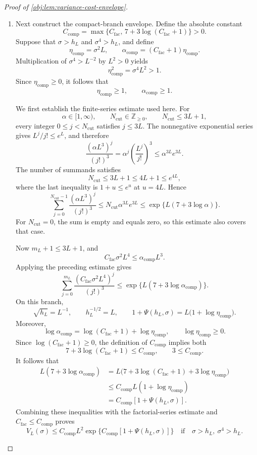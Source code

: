 \begin{proof}[Proof of \cref{obj:lem:variance-cost-envelope}]
\begin{enumerate}
\item Next construct the compact-branch envelope. Define the absolute constant
\[
C_{\mathrm{comp}}
=\max\{C_{\mathrm{fac}},\,7+3\log(C_{\mathrm{fac}}+1)\}>0.
\]
Suppose that \(\sigma>h_L\) and \(\sigma^4>h_L\), and define
\[
\eta_{\mathrm{comp}}=\sigma^2L,
\qquad
\alpha_{\mathrm{comp}}=(C_{\mathrm{fac}}+1)\eta_{\mathrm{comp}}.
\]
Multiplication of \(\sigma^4>L^{-2}\) by \(L^2>0\) yields
\[
\eta_{\mathrm{comp}}^2=\sigma^4L^2>1.
\]
Since \(\eta_{\mathrm{comp}}\ge0\), it follows that
\[
\eta_{\mathrm{comp}}\ge1,
\qquad
\alpha_{\mathrm{comp}}\ge1.
\]

We first establish the finite-series estimate used here. For
\[
\alpha\in[1,\infty),
\qquad
N_{\mathrm{cut}}\in\mathbb Z_{\ge0},
\qquad
N_{\mathrm{cut}}\le3L+1,
\]
every integer \(0\le j<N_{\mathrm{cut}}\) satisfies \(j\le3L\).
The nonnegative exponential series gives \(L^j/j!\le e^L\), and therefore
\[
\frac{(\alpha L^3)^j}{(j!)^3}
=\alpha^j\left(\frac{L^j}{j!}\right)^3
\le \alpha^{3L}e^{3L}.
\]
The number of summands satisfies
\[
N_{\mathrm{cut}}\le3L+1\le4L+1\le e^{4L},
\]
where the last inequality is \(1+u\le e^u\) at \(u=4L\). Hence
\[
\sum_{j=0}^{N_{\mathrm{cut}}-1}
\frac{(\alpha L^3)^j}{(j!)^3}
\le N_{\mathrm{cut}}\alpha^{3L}e^{3L}
\le \exp\{L(7+3\log\alpha)\}.
\]
For \(N_{\mathrm{cut}}=0\), the sum is empty and equals zero, so this estimate
also covers that case.

Now \(m_L+1\le3L+1\), and
\[
C_{\mathrm{fac}}\sigma^2L^4
\le \alpha_{\mathrm{comp}}L^3.
\]
Applying the preceding estimate gives
\[
\sum_{j=0}^{m_L}
\frac{(C_{\mathrm{fac}}\sigma^2L^4)^j}{(j!)^3}
\le
\exp\{L(7+3\log\alpha_{\mathrm{comp}})\}.
\]
On this branch,
\[
\sqrt{h_L}=L^{-1},
\qquad
h_L^{-1/2}=L,
\qquad
1+\Psi(h_L,\sigma)
=L\bigl(1+\log\eta_{\mathrm{comp}}\bigr).
\]
Moreover,
\[
\log\alpha_{\mathrm{comp}}
=\log(C_{\mathrm{fac}}+1)+\log\eta_{\mathrm{comp}},
\qquad
\log\eta_{\mathrm{comp}}\ge0.
\]
Since \(\log(C_{\mathrm{fac}}+1)\ge0\), the definition of
\(C_{\mathrm{comp}}\) implies both
\[
7+3\log(C_{\mathrm{fac}}+1)\le C_{\mathrm{comp}},
\qquad
3\le C_{\mathrm{comp}}.
\]
It follows that
\[
\begin{aligned}
L(7+3\log\alpha_{\mathrm{comp}})
&=L\bigl(7+3\log(C_{\mathrm{fac}}+1)
            +3\log\eta_{\mathrm{comp}}\bigr)\\
&\le C_{\mathrm{comp}}L(1+\log\eta_{\mathrm{comp}})\\
&=C_{\mathrm{comp}}[1+\Psi(h_L,\sigma)].
\end{aligned}
\]
Combining these inequalities with the factorial-series estimate and
\(C_{\mathrm{fac}}\le C_{\mathrm{comp}}\) proves
\[
V_L(\sigma)\le C_{\mathrm{comp}}L^2
\exp\{C_{\mathrm{comp}}[1+\Psi(h_L,\sigma)]\}
\quad\text{if}\quad
\sigma>h_L,\ \sigma^4>h_L.
\]


\end{enumerate}
\end{proof}
